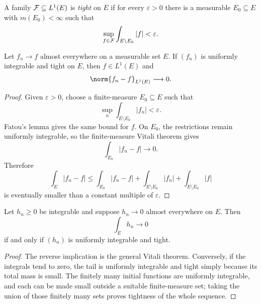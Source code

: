\begin{de}[Tightness]
A family $\mathcal{F}\subseteq L^1(E)$ is \emph{tight} on $E$ if for every $\varepsilon>0$ there is a measurable $E_0\subseteq E$ with $m(E_0)<\infty$ such that
\[
\sup_{f\in\mathcal{F}}\int_{E\setminus E_0}|f|<\varepsilon.
\]
\end{de}

\begin{thm}
Let $f_n\to f$ almost everywhere on a measurable set $E$. If $(f_n)$ is uniformly integrable and tight on $E$, then $f\in L^1(E)$ and
\[
\norm{f_n-f}_{L^1(E)}\longrightarrow0.
\]
\end{thm}

\begin{proof}
Given $\varepsilon>0$, choose a finite-measure $E_0\subseteq E$ such that
\[
\sup_n\int_{E\setminus E_0}|f_n|<\varepsilon.
\]
Fatou's lemma gives the same bound for $f$. On $E_0$, the restrictions remain uniformly integrable, so the finite-measure Vitali theorem gives
\[
\int_{E_0}|f_n-f|\to0.
\]
Therefore
\[
\int_E|f_n-f|
 \leq\int_{E_0}|f_n-f|
   +\int_{E\setminus E_0}|f_n|
   +\int_{E\setminus E_0}|f|
\]
is eventually smaller than a constant multiple of $\varepsilon$.
\end{proof}

\begin{cor}
Let $h_n\geq0$ be integrable and suppose $h_n\to0$ almost everywhere on $E$. Then
\[
\int_Eh_n\longrightarrow0
\]
if and only if $(h_n)$ is uniformly integrable and tight.
\end{cor}

\begin{proof}
The reverse implication is the general Vitali theorem. Conversely, if the integrals tend to zero, the tail is uniformly integrable and tight simply because its total mass is small. The finitely many initial functions are uniformly integrable, and each can be made small outside a suitable finite-measure set; taking the union of those finitely many sets proves tightness of the whole sequence.
\end{proof}
